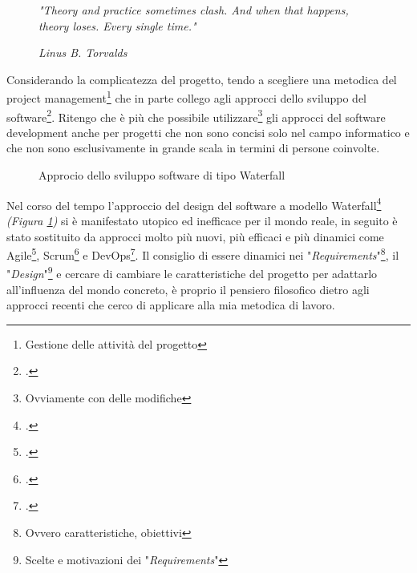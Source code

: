 \documentclass[a4paper, 10pt, final]{article} %
\newcommand{\InvisibleBorder}{
    (current bounding box.south west) ++($(-\fboxsep, -\fboxsep)-(0.5,0.5)$) coordinate (ll)
    (current bounding box.north east) ++($(\fboxsep, \fboxsep)+(0.5,0.5)$) coordinate (ur)
}
\begin{document}
    \begin{figure}[H]
        \Centering
        \vspace{1ex}
        \textit{"Theory and practice sometimes clash. And when that happens, theory loses. Every single time."}

        \RaggedLeft
        \vspace{1ex}

        \textit{\scriptsize{Linus B. Torvalds}}
        \vspace{1ex}
    \end{figure}

    Considerando la complicatezza del progetto, tendo a scegliere una metodica del project management\footnote{Gestione delle attivit\`{a} del progetto} che in parte collego agli approcci dello sviluppo del software\footcite[]{SoftwareDevelopmentProcess:Wiki}.
    Ritengo che \`{e} pi\`{u} che possibile utilizzare\footnote{Ovviamente con delle modifiche} gli approcci del software development anche per progetti che non sono concisi solo nel campo informatico e che non sono esclusivamente in grande scala in termini di persone coinvolte.
    \begin{figure}[H]
        \centering
        \caption{Approcio dello sviluppo software di tipo Waterfall}
        \label{fig:Waterfall}
    \end{figure}
    Nel corso del tempo l'approccio del design del software a modello Waterfall\footcite[]{WaterfallModel:Wiki} \emph{(Figura \ref{fig:Waterfall})} si \`{e} manifestato utopico ed inefficace per il mondo reale, in seguito \`{e} stato sostituito da approcci molto pi\`{u} nuovi, pi\`{u} efficaci e pi\`{u} dinamici come Agile\footcite[]{AgileModel:Wiki}, Scrum\footcite[]{ScrumModel:Wiki} e DevOps\footcite[]{DevOpsModel:Wiki}.
    Il consiglio di essere dinamici nei "\emph{Requirements}"\footnote{Ovvero caratteristiche, obiettivi}, il "\emph{Design}"\footnote{Scelte e motivazioni dei "\emph{Requirements}"} e cercare di cambiare le caratteristiche del progetto per adattarlo all'influenza del mondo concreto, \`{e} proprio il pensiero filosofico dietro agli approcci recenti che cerco di applicare alla mia metodica di lavoro.
\end{document}
